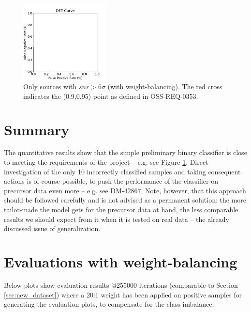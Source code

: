 \documentclass[DM,authoryear,toc]{lsstdoc}
\begin{document}
\begin{figure}[h]
  \includegraphics[width=0.4\textwidth]{det_13-resnet50-FullAugmentation-scratch-B64_epoch0002934_iter8000000__npy_data_0.1.2-6sigma_256by256__posw_1.png}
  \caption{Only sources with $snr > 6\sigma$  (with weight-balancing). The red cross indicates the (0.9,0.95) point as defined in OSS-REQ-0353.}
  \label{fig:longer_6sigma}
\end{figure}

\clearpage
\section{Summary}
\label{sec:verdict}
The quantitative results show that the simple preliminary binary classifier is close to meeting the requirements of the project -- e.g. see Figure \ref{fig:longer_6sigma}. Direct investigation of the only 10 incorrectly classified samples and taking consequent actions is of course possible, to push the performance of the classifier on precursor data even more -- e.g. see DM-42867. Note, however, that this approach should be followed carefully and is not advised as a permanent solution: the more tailor-made the model gets for the precursor data at hand, the less comparable results we should expect from it when it is tested on real data -- the already discussed issue of generalization.


\clearpage
\appendix
\section{Evaluations with weight-balancing}
Below plots show evaluation results @255000 iterations (comparable to Section \ref{sec:new_dataset}) where a 20:1 weight has been applied on positive samples for generating the evaluation plots, to compensate for the class imbalance.
\end{document}
